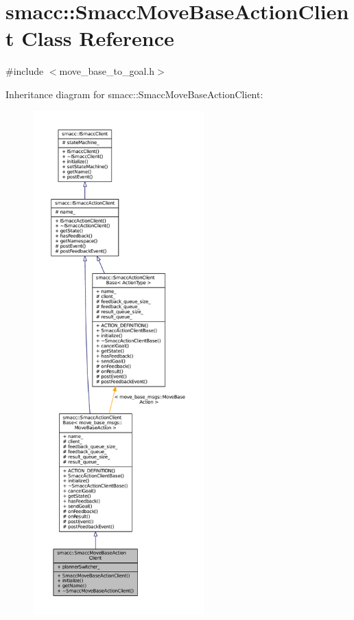 \hypertarget{classsmacc_1_1SmaccMoveBaseActionClient}{}\section{smacc\+:\+:Smacc\+Move\+Base\+Action\+Client Class Reference}
\label{classsmacc_1_1SmaccMoveBaseActionClient}


{\ttfamily \#include $<$move\+\_\+base\+\_\+to\+\_\+goal.\+h$>$}



Inheritance diagram for smacc\+:\+:Smacc\+Move\+Base\+Action\+Client\+:
\nopagebreak
\begin{figure}[H]
\begin{center}
\leavevmode
\includegraphics[height=550pt]{classsmacc_1_1SmaccMoveBaseActionClient__inherit__graph}
\end{center}
\end{figure}



